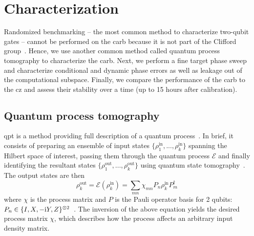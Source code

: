 \section{Characterization} 
Randomized benchmarking -- the most common method to characterize two-qubit gates -- cannot be performed on the \gls{carb} because it is not part of the Clifford group~\cite{Magesan2011ScalableProcesses, Magesan2012CharacterizingBenchmarking}. Hence, we use another common method called quantum process tomography to characterize the \gls{carb}. Next, we perform a fine target phase sweep and characterize conditional and dynamic phase errors as well as leakage out of the computational subspace. Finally, we compare the performance of the \gls{carb} to the \gls{cz} and assess their  stability over a time (up to 15 hours after calibration).

\subsection{Quantum process tomography}
\Gls{qpt} is a method providing full description of a quantum process~\cite{Chuang1997PrescriptionBox, Poyatos1997CompleteGate}. In brief, it consists of preparing an ensemble of input states $\{\rho_1^\mathrm{in}, ..., \rho_k^\mathrm{in}\}$ spanning the Hilbert space of interest, passing them through the quantum process $\mathcal{E}$ and finally identifying the resultant states  $\{\rho_1^\mathrm{out}, ..., \rho_k^\mathrm{out}\}$ using quantum state tomography~\cite{Reed2013EntanglementQubits}. The output states are then
\begin{equation}
    \rho_k^{\mathrm{out}} = \mathcal{E}(\rho_k^\mathrm{in}) = \sum_{m n} \chi_{m n} P_n \rho_k^\mathrm{in} P_m^\dag
\end{equation}
 where $\chi$ is the process matrix and $P$ is the Pauli operator basis for 2 qubits: $P_n \in \{I, X, -\mathrm i Y, Z\}^{\otimes 2}$~\cite{HeinsooDigitalQubits}. The inversion of the above equation yields the desired process matrix $\chi$, which describes how the process affects an arbitrary input density matrix. 
 
